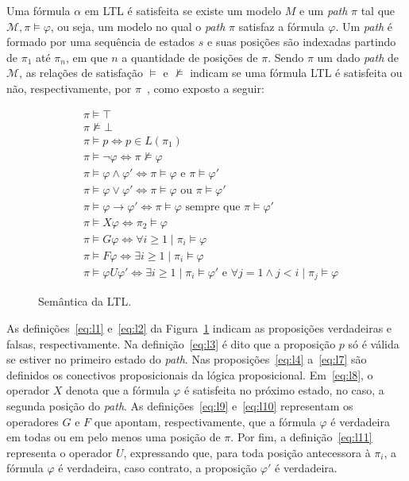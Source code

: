 Uma fórmula $\alpha$ em LTL é satisfeita se existe um modelo $M$ e um \textit{path} $\pi$ tal que $\mathcal{M}, \pi \models \varphi$, ou seja, um modelo no qual o \textit{path} $\pi$ satisfaz a fórmula $\varphi$. Um \textit{path} é formado por uma sequência de estados $s$ e suas posições são indexadas partindo de $\pi_{1}$ até $\pi_{n}$, em que $n$ a quantidade de posições de $\pi$. Sendo $\pi$ um dado \textit{path} de $\mathcal{M}$, as relações de satisfação $\models$ e $\nvDash$ indicam se uma fórmula LTL é satisfeita ou não, respectivamente, por $\pi$~\cite{huth2004logic}, como exposto a seguir: 

\begin{figure}[ht]
	\centering
	\begin{align}
	&\pi \models \top \label{eq:l1} \\
	&\pi \nvDash \bot \label{eq:l2} \\
	&\pi \models p \Longleftrightarrow p \in L(\pi_{1}) \label{eq:l3} \\
	&\pi \models \neg \varphi \iff \pi \not \models \varphi \label{eq:l4} \\
	&\pi \models \varphi \wedge \varphi' \iff \pi \models \varphi \mbox{ e } \pi \models \varphi' \label{eq:l5}\\
	&\pi \models \varphi \vee \varphi' \iff \pi \models \varphi \mbox{ ou } \pi \models \varphi' \label{eq:l6}\\
	&\pi \models \varphi \to \varphi' \iff \pi \models \varphi \mbox{ sempre que } \pi \models \varphi' \label{eq:l7}\\
	&\pi \models X\varphi \iff \pi_2 \models \varphi \label{eq:l8}\\
	&\pi \models G\varphi \iff \forall i \geq 1 \mid \pi_i \models \varphi \label{eq:l9}\\
	&\pi \models F\varphi \iff \exists i \geq 1 \mid \pi_i \models \varphi \label{eq:l10}\\
	&\pi \models \varphi U \varphi' \iff \exists i \geq 1 \mid \pi_i \models \varphi' \mbox{ e } \forall j = 1 \wedge j < i \mid \pi_j \models \varphi \label{eq:l11}
	\end{align}
	\caption{Semântica da LTL.
		\label{fig:ltl_sem}}
\end{figure}
\FloatBarrier

As definições~\ref{eq:l1} e~\ref{eq:l2} da Figura~\ref{fig:ltl_sem} indicam as proposições verdadeiras e falsas, respectivamente. Na definição~\ref{eq:l3} é dito que a proposição $p$ só é válida se estiver no primeiro estado do \textit{path}. Nas proposições~\ref{eq:l4} a~\ref{eq:l7} são definidos os conectivos proposicionais da lógica proposicional. Em~\ref{eq:l8}, o operador $X$ denota que a fórmula $\varphi$ é satisfeita no próximo estado, no caso, a segunda posição do \textit{path}. As definições~\ref{eq:l9} e~\ref{eq:l10} representam os operadores $G$ e $F$ que apontam, respectivamente, que a fórmula $\varphi$ é verdadeira em todas ou em pelo menos uma posição de $\pi$. Por fim, a definição~\ref{eq:l11} representa o operador $U$, expressando que, para toda posição antecessora à $\pi_{i}$, a fórmula $\varphi$ é verdadeira, caso contrato, a proposição $\varphi'$ é verdadeira.

